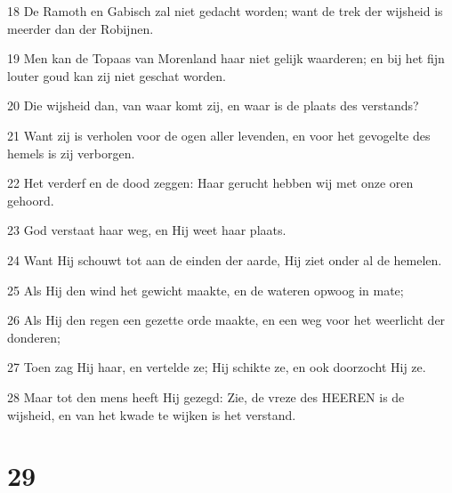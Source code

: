 \par 18 De Ramoth en Gabisch zal niet gedacht worden; want de trek der wijsheid is meerder dan der Robijnen.
\par 19 Men kan de Topaas van Morenland haar niet gelijk waarderen; en bij het fijn louter goud kan zij niet geschat worden.
\par 20 Die wijsheid dan, van waar komt zij, en waar is de plaats des verstands?
\par 21 Want zij is verholen voor de ogen aller levenden, en voor het gevogelte des hemels is zij verborgen.
\par 22 Het verderf en de dood zeggen: Haar gerucht hebben wij met onze oren gehoord.
\par 23 God verstaat haar weg, en Hij weet haar plaats.
\par 24 Want Hij schouwt tot aan de einden der aarde, Hij ziet onder al de hemelen.
\par 25 Als Hij den wind het gewicht maakte, en de wateren opwoog in mate;
\par 26 Als Hij den regen een gezette orde maakte, en een weg voor het weerlicht der donderen;
\par 27 Toen zag Hij haar, en vertelde ze; Hij schikte ze, en ook doorzocht Hij ze.
\par 28 Maar tot den mens heeft Hij gezegd: Zie, de vreze des HEEREN is de wijsheid, en van het kwade te wijken is het verstand.

\chapter{29}

